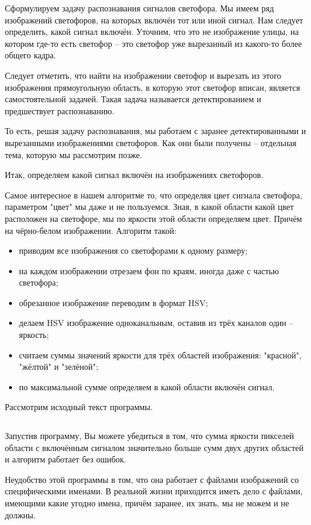 \solutionSection

Сформулируем задачу распознавания сигналов светофора. Мы имеем ряд изображений светофоров, на которых включён тот или иной сигнал. Нам следует определить, какой сигнал включён. Уточним, что это не изображение улицы, на котором где-то есть светофор – это светофор уже вырезанный из какого-то более общего кадра.

Следует отметить, что найти на изображении светофор и вырезать из этого изображения прямоугольную область, в которую этот светофор вписан, является самостоятельной задачей. Такая задача называется детектированием и предшествует распознаванию.

То есть, решая задачу распознавания, мы работаем с заранее детектированными и вырезанными изображениями светофоров. Как они были получены – отдельная тема, которую мы рассмотрим позже.

Итак, определяем какой сигнал включён на изображениях светофоров.

Самое интересное в нашем алгоритме то, что определяя цвет сигнала светофора, параметром "цвет" мы даже и не пользуемся. Зная, в какой области какой цвет расположен на светофоре, мы по яркости этой области определяем цвет. Причём на чёрно-белом изображении. Алгоритм такой:
\begin{itemize}
    \item приводим все изображения со светофорами к одному размеру;
    \item на каждом изображении отрезаем фон по краям, иногда даже с частью светофора;
    \item обрезанное изображение переводим в формат HSV;
    \item делаем HSV изображение одноканальным, оставив из трёх каналов один – яркость;
    \item считаем суммы значений яркости для трёх областей изображения: "красной", "жёлтой" и "зелёной";
    \item по максимальной сумме определяем в какой области включён сигнал.
\end{itemize}

Рассмотрим исходный текст программы.

\inputminted[fontsize=\footnotesize, linenos]{python}{2nd_tour/ats/task_04/source.py}

Запустив программу, Вы можете убедиться в том, что сумма яркости пикселей области с включённым сигналом значительно больше сумм двух других областей и алгоритм работает без ошибок.

Неудобство этой программы в том, что она работает с файлами изображений со специфическими именами. В реальной жизни приходится иметь дело с файлами, имеющими какие угодно имена, причём заранее, их знать, мы не можем и не должны.